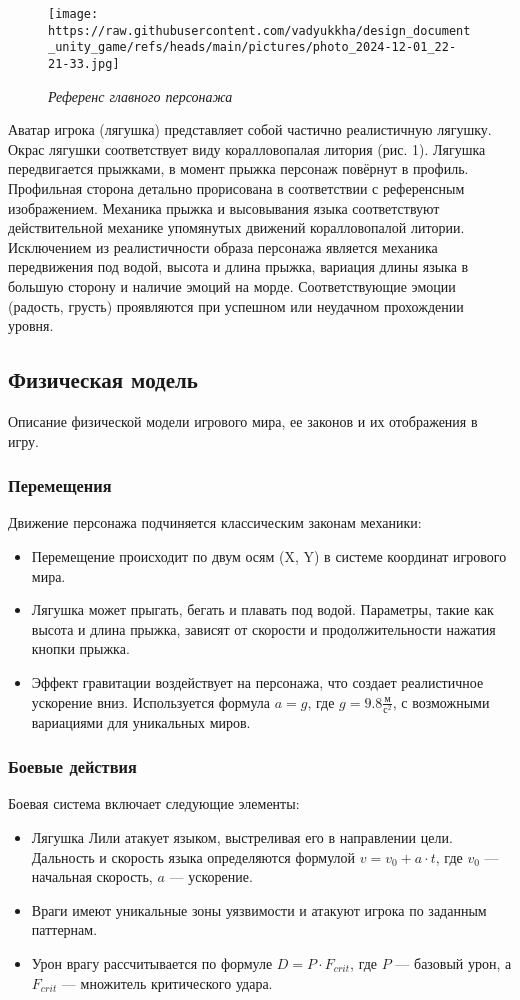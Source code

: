 \documentclass{article}
\begin{document}
\begin{wrapfigure}{r}{0.4\textwidth}
    \centering
    \texttt{[image: https://raw.githubusercontent.com/vadyukkha/design\_document\_unity\_game/refs/heads/main/pictures/photo\_2024-12-01\_22-21-33.jpg]} 
    \caption{\textit {Референс главного персонажа}}
    \label{fig:example}
\end{wrapfigure} 
Аватар игрока (лягушка) представляет собой частично реалистичную лягушку. Окрас лягушки соответствует виду коралловопалая литория (рис. 1).  Лягушка передвигается прыжками, в  момент прыжка персонаж повёрнут в профиль. Профильная сторона детально прорисована в соответствии с референсным изображением. Механика прыжка и высовывания языка соответствуют действительной механике упомянутых движений коралловопалой литории. Исключением из реалистичности образа персонажа является механика передвижения под водой, высота и длина прыжка, вариация длины языка в большую сторону и наличие эмоций на морде. Соответствующие эмоции (радость, грусть) проявляются при успешном или неудачном прохождении уровня.

\subsection{Физическая модель}
Описание физической модели игрового мира, ее законов и их отображения в игру. 

\subsubsection{Перемещения}
Движение персонажа подчиняется классическим законам механики: 
\begin{itemize}
    \item Перемещение происходит по двум осям (X, Y) в системе координат игрового мира.
    \item Лягушка может прыгать, бегать и плавать под водой. Параметры, такие как высота и длина прыжка, зависят от скорости и продолжительности нажатия кнопки прыжка.
    \item Эффект гравитации воздействует на персонажа, что создает реалистичное ускорение вниз. Используется формула $a = g$, где $g = 9.8 \frac{м}{с^2}$, с возможными вариациями для уникальных миров.
\end{itemize}

\subsubsection{Боевые действия}
Боевая система включает следующие элементы:
\begin{itemize}
    \item Лягушка Лили атакует языком, выстреливая его в направлении цели. Дальность и скорость языка определяются формулой $v = v_0 + a \cdot t$, где $v_0$ — начальная скорость, $a$ — ускорение.
    \item Враги имеют уникальные зоны уязвимости и атакуют игрока по заданным паттернам.
    \item Урон врагу рассчитывается по формуле $D = P \cdot F_{crit}$, где $P$ — базовый урон, а $F_{crit}$ — множитель критического удара.
\end{itemize}
\end{document}
